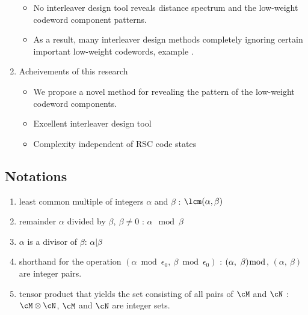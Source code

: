 \begin{enumerate}
\begin{itemize}
\item No interleaver design tool reveals distance spectrum and the low-weight codeword component patterns.

\item As a result, many interleaver design methods completely ignoring certain important low-weight codewords, example \cite{ref5}. 
\end{itemize}


\item Acheivements of this research
\begin{itemize}
\item We propose a novel method for revealing the pattern of the low-weight codeword components. 

\item  Excellent interleaver design tool

\item Complexity independent of RSC code states
\end{itemize}
\end{enumerate}


\subsection{Notations}
\begin{enumerate}
\item  least common multiple of integers $\alpha$ and $\beta$ : $\lcm(\alpha,\beta)$
\item remainder $\alpha$ divided by $\beta,~\beta \neq 0$ : $\alpha \mod \beta$
\item $\alpha$ is a divisor of $\beta$: $\alpha | \beta$ 
\item shorthand for the operation $(\alpha \bmod \epsilon_0,~\beta \bmod \epsilon_0)$ : $(\alpha,~\beta) \bmod $, $(\alpha,~\beta)$ are integer pairs.
\item tensor product that yields the set consisting of all pairs of $\cM$ and $\cN$ : $\cM \otimes \cN$, $\cM$ and $\cN$ are integer sets.
\end{enumerate}


